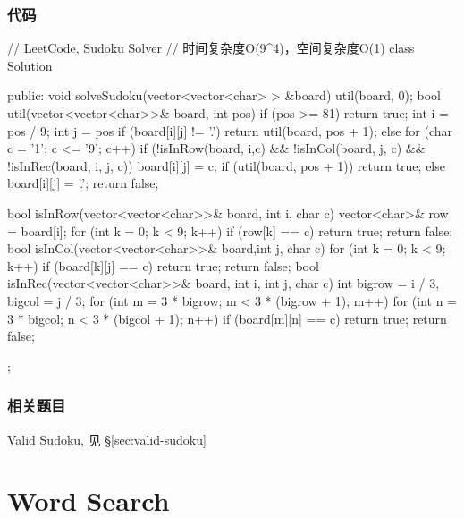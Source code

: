 \subsubsection{代码}
\begin{Code}
// LeetCode, Sudoku Solver
// 时间复杂度O(9^4)，空间复杂度O(1)
class Solution {
public:
    void solveSudoku(vector<vector<char> > &board) {
        util(board, 0);
    }
    bool util(vector<vector<char>>& board, int pos)
    {
        if (pos >= 81)
            return true;
        int i = pos / 9;
        int j = pos %
        if (board[i][j] != '.')
            return util(board, pos + 1);
        else
        {
            for (char c = '1'; c <= '9'; c++)
            {
                if (!isInRow(board, i,c) && !isInCol(board, j, c) && !isInRec(board, i, j, c))
                {
                    board[i][j] = c;
                    if (util(board, pos + 1))
                        return true;
                    else
                        board[i][j] = '.';
                }
            }
            return false;
        }
    }

    bool isInRow(vector<vector<char>>& board, int i, char c)
    {
        vector<char>& row = board[i];
        for (int k = 0; k < 9; k++)
        {
            if (row[k] == c)
                return true;
        }
        return false;
    }
    bool isInCol(vector<vector<char>>& board,int j, char c)
    {
        for (int k = 0; k < 9; k++)
        {
            if (board[k][j] == c)
                return true;
        }
        return false;
    }
    bool isInRec(vector<vector<char>>& board, int i, int j, char c)
    {
        int bigrow = i / 3, bigcol = j / 3;
        for (int m = 3 * bigrow; m < 3 * (bigrow + 1); m++)
        {
            for (int n = 3 * bigcol; n < 3 * (bigcol + 1); n++)
                if (board[m][n] == c)
                    return true;
        }
        return false;
    }
};
\end{Code}


\subsubsection{相关题目}
\begindot
\item Valid Sudoku, 见 \S \ref{sec:valid-sudoku}
\myenddot


\section{Word Search} %
\label{sec:word-search}


